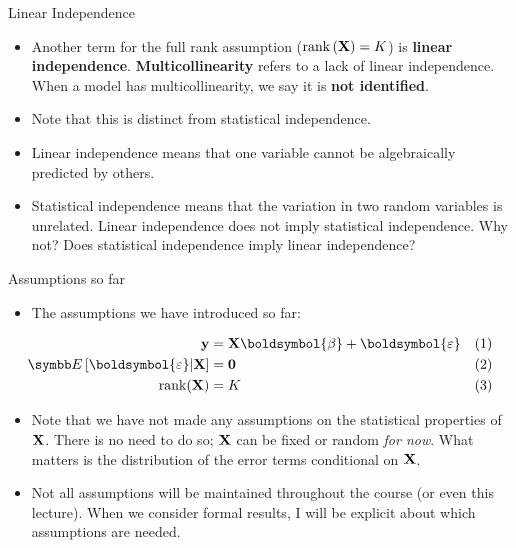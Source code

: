 \documentclass[aspectratio=169,11pt]{beamer}
\begin{document}
\begin{frame}{Linear Independence}
\begin{itemize}

	\item Another term for the full rank assumption ($\operatorname{rank}\left({\bf X}\right)=K$) is {\bf linear independence}.
	 {\bf Multicollinearity} refers to a lack of linear independence. When a model has multicollinearity, we 
  	say it is {\bf not identified}. 

	\medskip
	\item Note that this is distinct from statistical independence. 

	\medskip
	\item Linear independence means that one variable cannot be algebraically predicted by others. 

	\medskip
	\item Statistical independence means that the variation in two random variables is unrelated.
	Linear independence does not imply statistical independence. Why not? Does statistical independence
	imply linear independence? 
\end{itemize}
\end{frame}


\begin{frame}{Assumptions so far}
\begin{itemize}
	\item The assumptions we have introduced so far:
\end{itemize}

\begin{align*}
{\bf y} & =  {\bf X}\boldsymbol{\beta}+\boldsymbol{\varepsilon}	& (1)\\
\E\left[\boldsymbol{\varepsilon}|{\bf X}\right] & =  {\bf 0}						& (2) \\
\operatorname{rank}({\bf X}) & = K 	& (3)
\end{align*}

\begin{itemize}
	\item Note that we have not made any assumptions on the statistical properties of ${\bf X}$.
	There is no need to do so; ${\bf X}$ can be fixed or random \emph{for now}. What matters
	is the distribution of the error terms conditional on  ${\bf X}$.

	\item Not all assumptions will be maintained throughout the course (or even this lecture).
	When we consider formal results, I will be explicit about which assumptions are needed. 
	
\end{itemize}
\end{frame}
\end{document}
